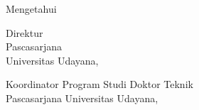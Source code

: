 \begin{center}
	Mengetahui
\end{center}

\vspace{0.75cm}
\noindent\begin{minipage}[t]{0.47\textwidth}
	\raggedright
	Direktur \\
	Pascasarjana \\
	Universitas Udayana,\\[2.5cm]
	
\end{minipage}%
\hfill%
\begin{minipage}[t]{0.47\textwidth}
	\raggedright
	Koordinator Program Studi Doktor Teknik\\
	Pascasarjana
	Universitas Udayana,\\[2.5cm]
	
\end{minipage}%

